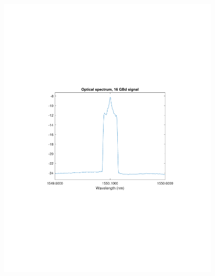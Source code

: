 \begin{refsection}
\begin{figure}[H]
	\centering
	\begin{minipage}{0.43\textwidth}
		\centering
		\includegraphics[clip, trim=4cm 8cm 4cm 8cm, width=1\textwidth]{./sdf/m_qam_system/figures/expResults/homodyne/16GBdOSASpectrum.pdf}
		\label{fig:16GBdOptiSpectHm}
	\end{minipage}
	\begin{minipage}{0.43\textwidth}
		\centering

\end{minipage}
\end{figure}
\end{refsection}
